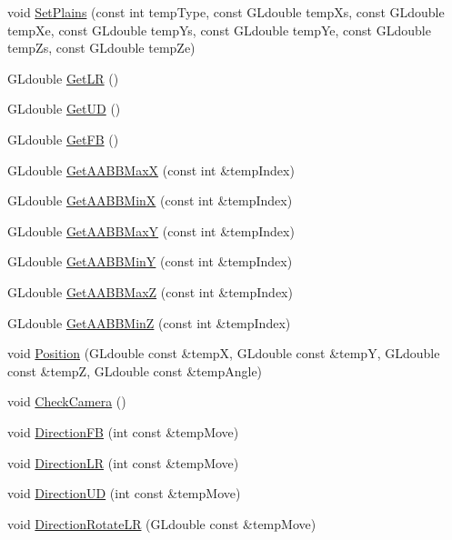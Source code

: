 \begin{DoxyCompactItemize}
\item 
void \hyperlink{class_camera_a5b5c1468bdb3b8e6e654bea66c9561b8}{Set\+Plains} (const int temp\+Type, const G\+Ldouble temp\+Xs, const G\+Ldouble temp\+Xe, const G\+Ldouble temp\+Ys, const G\+Ldouble temp\+Ye, const G\+Ldouble temp\+Zs, const G\+Ldouble temp\+Ze)
\item 
G\+Ldouble \hyperlink{class_camera_a5d71756678367cc9ef6d3186dff7e821}{Get\+LR} ()
\item 
G\+Ldouble \hyperlink{class_camera_acaa842acd09e3a18c409ddc0c89cf808}{Get\+UD} ()
\item 
G\+Ldouble \hyperlink{class_camera_a2c82b9713e7cc1fb77130aad72728478}{Get\+FB} ()
\item 
G\+Ldouble \hyperlink{class_camera_a60cc1df56165f876367b82bf3016879d}{Get\+A\+A\+B\+B\+MaxX} (const int \&temp\+Index)
\item 
G\+Ldouble \hyperlink{class_camera_a7b0c8231ff696a81330b0960ee4ff719}{Get\+A\+A\+B\+B\+MinX} (const int \&temp\+Index)
\item 
G\+Ldouble \hyperlink{class_camera_a65002f8d31f7d541284126550e033c12}{Get\+A\+A\+B\+B\+MaxY} (const int \&temp\+Index)
\item 
G\+Ldouble \hyperlink{class_camera_adcd706fee322ada843a3ac753aa69549}{Get\+A\+A\+B\+B\+MinY} (const int \&temp\+Index)
\item 
G\+Ldouble \hyperlink{class_camera_a8cba314f46549c3d71be172b86ad5fe0}{Get\+A\+A\+B\+B\+MaxZ} (const int \&temp\+Index)
\item 
G\+Ldouble \hyperlink{class_camera_a333f233675f83907a0f8a8e3274865fe}{Get\+A\+A\+B\+B\+MinZ} (const int \&temp\+Index)
\item 
void \hyperlink{class_camera_a259204729f7a60277c6f6215559adcc0}{Position} (G\+Ldouble const \&tempX, G\+Ldouble const \&tempY, G\+Ldouble const \&tempZ, G\+Ldouble const \&temp\+Angle)
\item 
void \hyperlink{class_camera_a5757577b0e11b8722bf251ee086eef1d}{Check\+Camera} ()
\item 
void \hyperlink{class_camera_a19d7bf6f171a46abe5b7743c0429ca75}{Direction\+FB} (int const \&temp\+Move)
\item 
void \hyperlink{class_camera_a11f6493139834cc9d31a1c28e5effa1a}{Direction\+LR} (int const \&temp\+Move)
\item 
void \hyperlink{class_camera_a3134cb509a1167898806c94bf6f3bf28}{Direction\+UD} (int const \&temp\+Move)
\item 
void \hyperlink{class_camera_a9b7f4a96faa388248f8350c733789688}{Direction\+Rotate\+LR} (G\+Ldouble const \&temp\+Move)

\end{DoxyCompactItemize}

